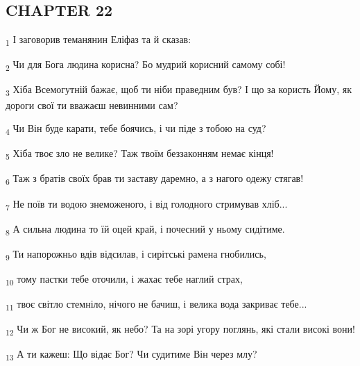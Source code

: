 \subsection{CHAPTER 22}
\begin{tcolorbox}
\textsubscript{1} І заговорив теманянин Еліфаз та й сказав:
\end{tcolorbox}
\begin{tcolorbox}
\textsubscript{2} Чи для Бога людина корисна? Бо мудрий корисний самому собі!
\end{tcolorbox}
\begin{tcolorbox}
\textsubscript{3} Хіба Всемогутній бажає, щоб ти ніби праведним був? І що за користь Йому, як дороги свої ти вважаєш невинними сам?
\end{tcolorbox}
\begin{tcolorbox}
\textsubscript{4} Чи Він буде карати, тебе боячись, і чи піде з тобою на суд?
\end{tcolorbox}
\begin{tcolorbox}
\textsubscript{5} Хіба твоє зло не велике? Таж твоїм беззаконням немає кінця!
\end{tcolorbox}
\begin{tcolorbox}
\textsubscript{6} Таж з братів своїх брав ти заставу даремно, а з нагого одежу стягав!
\end{tcolorbox}
\begin{tcolorbox}
\textsubscript{7} Не поїв ти водою знеможеного, і від голодного стримував хліб...
\end{tcolorbox}
\begin{tcolorbox}
\textsubscript{8} А сильна людина то їй оцей край, і почесний у ньому сидітиме.
\end{tcolorbox}
\begin{tcolorbox}
\textsubscript{9} Ти напорожньо вдів відсилав, і сирітські рамена гнобились,
\end{tcolorbox}
\begin{tcolorbox}
\textsubscript{10} тому пастки тебе оточили, і жахає тебе наглий страх,
\end{tcolorbox}
\begin{tcolorbox}
\textsubscript{11} твоє світло стемніло, нічого не бачиш, і велика вода закриває тебе...
\end{tcolorbox}
\begin{tcolorbox}
\textsubscript{12} Чи ж Бог не високий, як небо? Та на зорі угору поглянь, які стали високі вони!
\end{tcolorbox}
\begin{tcolorbox}
\textsubscript{13} А ти кажеш: Що відає Бог? Чи судитиме Він через млу?
\end{tcolorbox}
